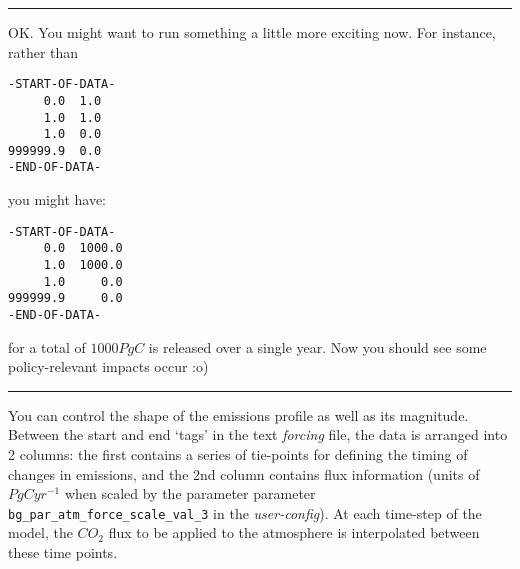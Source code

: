 \vspace{1mm} \noindent\rule{4cm}{0.1mm} \vspace{2mm}

\noindent OK. You might want to run something a little more exciting now. For instance, rather than
\vspace{-2pt}\footnotesize\begin{verbatim}
-START-OF-DATA-
     0.0  1.0
     1.0  1.0
     1.0  0.0
999999.9  0.0
-END-OF-DATA-
\end{verbatim}\normalsize\vspace{-2pt}
you might have:
\vspace{-2pt}\footnotesize\begin{verbatim}
-START-OF-DATA-
     0.0  1000.0
     1.0  1000.0
     1.0     0.0
999999.9     0.0
-END-OF-DATA-
\end{verbatim}\normalsize\vspace{-2pt}
for a total of \(1000 PgC\) is released over a single year. Now you should see some policy-relevant impacts occur :o)

\vspace{1mm} \noindent\rule{4cm}{0.1mm} \vspace{2mm}

\noindent You can control the shape of the emissions profile as well as its magnitude. Between the start and end ‘tags’ in the text \textit{forcing} file, the data is arranged into 2 columns: the first contains a series of tie-points for defining the timing of changes in emissions, and the 2nd column contains flux information (units of \(PgC yr^{-1}\) when scaled by the parameter parameter \texttt{bg\_par\_atm\_force\_scale\_val\_3} in the \textit{user-config}). At each time-step of the model, the \(CO_{2}\) flux to be applied to the atmosphere is interpolated between these time points.

\vspace{1mm}

